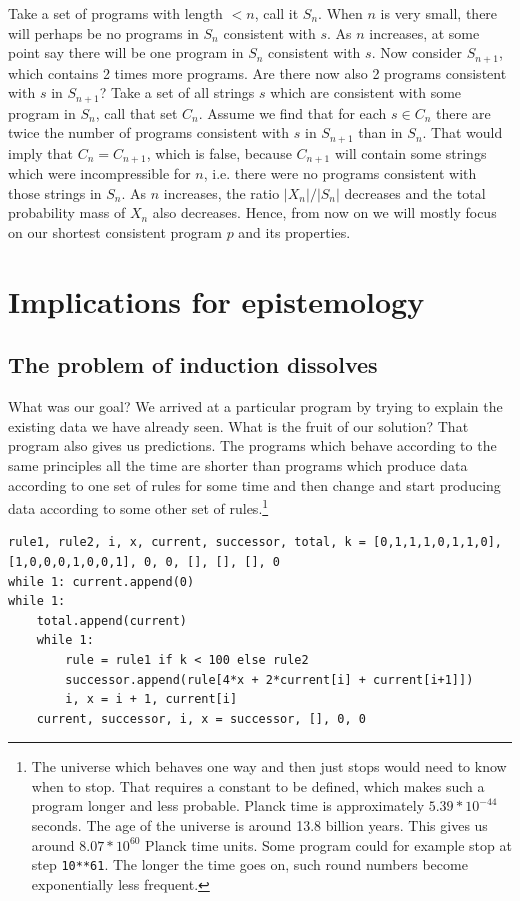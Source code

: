 Take a set of programs with length $<n$, call it $S_n$.
When $n$ is very small, there will perhaps be no programs in $S_n$ consistent with $s$.
As $n$ increases, at some point say there will be one program in $S_n$ consistent with $s$.
Now consider $S_{n+1}$, which contains 2 times more programs.
Are there now also 2 programs consistent with $s$ in $S_{n+1}$?
Take a set of all strings $s$ which are consistent with some program in $S_n$, call that set $C_n$.
Assume we find that for each $s \in C_n$ there are twice the number of programs consistent with $s$ in $S_{n+1}$ than in $S_n$.
That would imply that $C_n = C_{n+1}$, which is false, because $C_{n+1}$ will contain some strings which were incompressible for $n$, i.e. there were no programs consistent with those strings in $S_n$.
As $n$ increases, the ratio $|X_n|/|S_n|$ decreases and the total probability mass of $X_n$ also decreases.
Hence, from now on we will mostly focus on our shortest consistent program $p$ and its properties.

\newpage

\section{Implications for epistemology}

\subsection{The problem of induction dissolves}

What was our goal?
We arrived at a particular program by trying to explain the existing data we have already seen.
What is the fruit of our solution?
That program also gives us predictions.
The programs which behave according to the same principles all the time are shorter than programs which produce data according to one set of rules for some time and then change and start producing data according to some other set of rules.\footnote{
The universe which behaves one way and then just stops would need to know when to stop.
That requires a constant to be defined, which makes such a program longer and less probable.
Planck time is approximately $5.39 * 10^{−44}$ seconds.
The age of the universe is around 13.8 billion years.
This gives us around $8.07 * 10^{60}$ Planck time units.
Some program could for example stop at step \texttt{10**61}.
The longer the time goes on, such round numbers become exponentially less frequent.
}

\begin{lstlisting}[caption={A short program using one rule for the first 100 time steps, another rule from then on. This program is longer than just using the same rule all the time.}]
rule1, rule2, i, x, current, successor, total, k = [0,1,1,1,0,1,1,0], [1,0,0,0,1,0,0,1], 0, 0, [], [], [], 0
while 1: current.append(0)
while 1:
	total.append(current)
	while 1:
		rule = rule1 if k < 100 else rule2
		successor.append(rule[4*x + 2*current[i] + current[i+1]])
		i, x = i + 1, current[i]
	current, successor, i, x = successor, [], 0, 0
\end{lstlisting}

